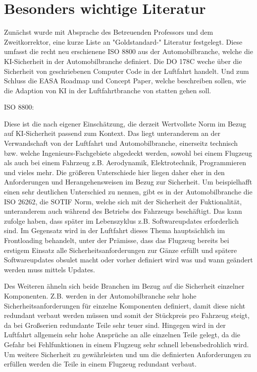\section{Besonders wichtige Literatur}
Zunächst wurde mit Absprache des Betreuenden Professors und dem Zweitkorrektor, eine kurze Liste an 
"Goldstandard-" Literatur festgelegt. Diese umfasst die recht neu erschienene ISO 8800 aus der Automobilbranche, 
welche die KI-Sicherheit in der Automobilbranche definiert. Die DO 178C weche über die Sicherheit von geschriebenen 
Computer Code in der Luftfahrt handelt. Und zum Schluss die EASA Roadmap und Concept Paper, welche beschreiben sollen, 
wie die Adaption von KI in der Luftfahrtbranche von statten gehen soll.


ISO 8800:

Diese ist die nach eigener Einschätzung, die derzeit Wertvollste Norm im Bezug auf KI-Sicherheit passend zum Kontext. 
Das liegt unteranderem an der Verwandschaft von der Luftfahrt und Automobilbranche, einerseitz technisch bzw. welche 
Ingenieurs-Fachgebiete abgedeckt werden, sowohl bei einem Flugzeug als auch bei einem Fahrzeug z.B. Aerodynamik, Elektrotechnik, 
Programmieren und vieles mehr. Die größeren Unterschiede hier liegen daher eher in den Anforderungen und Herangehensweisen 
im Bezug zur Sicherheit. Um beispielhafft einen sehr deutlichen Unterschied zu nennen, gibt es in der Automobilbranche 
die ISO 26262, die SOTIF Norm, welche sich mit der Sicherheit der Fuktionalität, unteranderem auch während des Betriebs 
des Fahrzeugs beschäftigt. Das kann zufolge haben, dass später im Lebenszyklus z.B. Softwareupdates erforderlich sind. 
Im Gegensatz wird in der Luftfahrt dieses Thema hauptsächlich im Frontloading behandelt, unter der Prämisse, dass das Flugzeug 
bereits bei erstigem Einsatz alle Sicherheitsanforderungen zur Gänze erfüllt und spätere Softwareupdates obsulet macht oder 
vorher definiert wird was und wann geändert werden muss mittels Updates.

Des Weiteren ähneln sich beide Branchen im Bezug auf die Sicherheit einzelner Komponenten. Z.B. werden in der Automobilbranche 
sehr hohe Sicherheitsanforderungen für einzelne Komponenten definiert, damit diese nicht redundant verbaut werden müssen und somit 
der Stückpreis pro Fahrzeug steigt, da bei Großserien redundante Teile sehr teuer sind. Hingegen wird in der Luftfahrt 
allgemein sehr hohe Ansprüche an alle einzelnen Teile gelegt, da die Gefahr bei Fehlfunktionen in einem Flugzeug sehr schnell 
lebensbedrohlich wird. Um weitere Sicherheit zu gewährleisten und um die definierten Anforderungen zu erfüllen werden die 
Teile in einem Flugzeug redundant verbaut.

